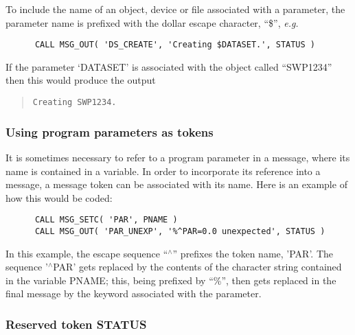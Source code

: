 \documentclass[twoside,11pt]{article}
\newcommand{\xlabel}[1]{}
\renewcommand{\_}{\texttt{\symbol{95}}}
\begin{document}
To include the name of an object, device or file associated with a parameter, 
the parameter name is prefixed with the dollar escape character, ``\$'',
\textit{e.g.}

\begin {small}
\begin{verbatim}
      CALL MSG_OUT( 'DS_CREATE', 'Creating $DATASET.', STATUS )
\end{verbatim}
\end {small}

If the parameter `DATASET' is associated with the object called ``SWP1234'' 
then this would produce the output

\begin {quote}
\begin {small}
\begin{verbatim}
Creating SWP1234.
\end{verbatim}
\end {small}
\end {quote}


\subsubsection{\xlabel{using_program_parameters_as_tokens}Using program parameters as tokens}

It is sometimes necessary to refer to a program parameter in a message, where
its name is contained in a variable. 
In order to incorporate its reference into a message, a message token can be
associated with its name. 
Here is an example of how this would be coded:

\begin {small}
\begin{verbatim}
      CALL MSG_SETC( 'PAR', PNAME )
      CALL MSG_OUT( 'PAR_UNEXP', '%^PAR=0.0 unexpected', STATUS )
\end{verbatim}
\end {small}

In this example, the escape sequence ``$^\wedge$'' prefixes the token name,
'PAR'. 
The sequence '$^\wedge$PAR' gets replaced by the contents of the character
string contained in the variable PNAME; this, being prefixed by ``\%'', then
gets replaced in the final message by the keyword associated with the
parameter. 


\subsubsection{\xlabel{reserved_token_status}Reserved token STATUS}
\end{document}
